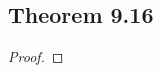 \documentclass[../../main.tex]{subfiles}
\begin{document}
\subsection{Theorem 9.16}
\begin{wts}

\end{wts}
\begin{proof}

\end{proof}
\end{document}
